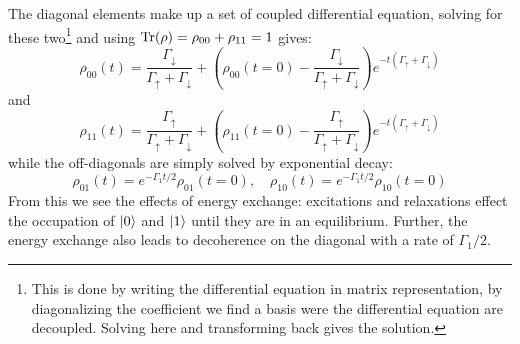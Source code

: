 The diagonal elements make up a set of coupled differential equation, solving for these two\footnote{This is done by writing the differential equation in matrix representation, by diagonalizing the coefficient we find a basis were the differential equation are decoupled. Solving here and transforming back gives the solution. }  and using $\Tr(\rho) = \rho_{00} + \rho_{11} = 1$ gives:
\begin{equation}
\rho_{00}(t) = \frac{\Gamma_\downarrow}{\Gamma_\uparrow + \Gamma_\downarrow} + \left(\rho_{00}(t=0) -  \frac{\Gamma_\downarrow}{\Gamma_\uparrow + \Gamma_\downarrow}\right)e^{-t(\Gamma_\uparrow + \Gamma_\downarrow)}
\end{equation}
and 
\begin{equation}    
\rho_{11}(t) = \frac{\Gamma_\uparrow}{\Gamma_\uparrow + \Gamma_\downarrow}+\left( \rho_{11}(t=0) -\frac{ \Gamma_\uparrow}{\Gamma_\uparrow + \Gamma_\downarrow}\right) e^{-t(\Gamma_\uparrow + \Gamma_\downarrow)}
\end{equation}
while the off-diagonals are simply solved by exponential decay:
\begin{equation}
    \rho_{01}(t) = e^{-\Gamma_1 t/2}\rho_{01}(t=0), \quad \rho_{10}(t) = e^{-\Gamma_1 t/2}\rho_{10}(t=0)
\end{equation}
From this we see the effects of energy exchange: excitations and relaxations effect the occupation of $\ket{0}$ and $\ket{1}$ until they are in an equilibrium. Further, the energy exchange also leads to decoherence on the diagonal with a rate of $\Gamma_1/2$. 
